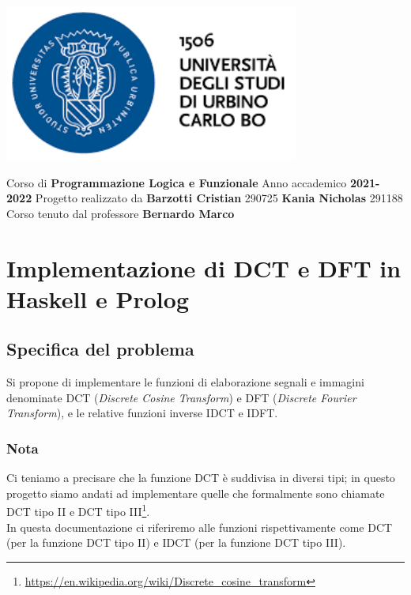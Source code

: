 \documentclass{report}
\begin{document}
	\centerline{\includegraphics{logo1}}
	\bigbreak

	\begin{center}
		Corso di
        \vskip 0.2cm
		\large{\textbf{Programmazione Logica e Funzionale}}
		\vskip 2cm
		Anno accademico
        \vskip 0.2cm
 		\textbf{2021-2022}
		\vskip 2cm
		Progetto realizzato da
        \vskip 0.2cm
		\textbf{Barzotti Cristian}
        \vskip 0.1cm 290725
        \vskip 0.2cm
        \textbf{Kania Nicholas} 
        \vskip 0.1cm 
        291188
		\vfill
		Corso tenuto dal professore
        \vskip 0.2cm
		\large{\textbf{Bernardo Marco}}
	\end{center}
	
	\part*{Implementazione di DCT e DFT in Haskell e Prolog}
	\tableofcontents %


	\chapter{Specifica del problema}
	Si propone di implementare le funzioni di elaborazione segnali e immagini denominate DCT (\textit{Discrete Cosine Transform}) e DFT (\textit{Discrete Fourier Transform}), e le relative funzioni inverse IDCT e IDFT. \\
	\section*{Nota}
	Ci teniamo a precisare che la funzione DCT è suddivisa in diversi tipi; in questo progetto siamo andati ad implementare quelle che formalmente sono chiamate DCT tipo II e DCT tipo III\footnote{\url{https://en.wikipedia.org/wiki/Discrete_cosine_transform}}.\\ 
	In questa documentazione ci riferiremo alle funzioni rispettivamente come DCT (per la funzione DCT tipo II) e IDCT (per la funzione DCT tipo III).
	
\end{document}
